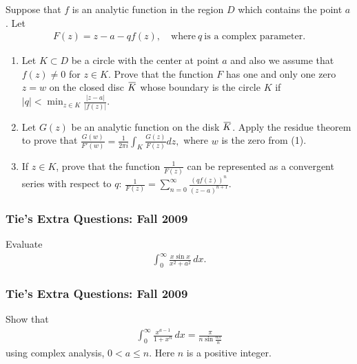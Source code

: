 Suppose that \(f\) is an analytic function in the region \(D\) which
contains the point \(a\). Let
\begin{align*}F(z)= z-a-qf(z),\quad \text{where}~ q \ \text{is a complex parameter}.\end{align*}

\begin{enumerate}
\def\labelenumi{(\arabic{enumi})}
\item
  Let \(K\subset D\) be a circle with the center at point \(a\) and also
  we assume that \(f(z)\not =0\) for \(z\in K\). Prove that the function
  \(F\) has one and only one zero \(z=w\) on the closed disc
  \(\mkern 1.5mu\overline{\mkern-1.5muK\mkern-1.5mu}\mkern 1.5mu\) whose
  boundary is the circle \(K\) if
  \(\displaystyle{ |q|<\min_{z\in K} \frac{|z-a|}{|f(z)|}.}\)\\
\item
  Let \(G(z)\) be an analytic function on the disk
  \(\mkern 1.5mu\overline{\mkern-1.5muK\mkern-1.5mu}\mkern 1.5mu\).
  Apply the residue theorem to prove that
  \(\displaystyle{ \frac{G(w)}{F'(w)}=\frac{1}{2\pi i}\int_K \frac{G(z)}{F(z)} dz,}\)
  where \(w\) is the zero from (1).\\
\item
  If \(z\in K\), prove that the function
  \(\displaystyle{\frac{1}{F(z)}}\) can be represented as a convergent
  series with respect to \(q\):
  \(\displaystyle{ \frac{1}{F(z)}=\sum_{n=0}^{\infty} \frac{(qf(z))^n}{(z-a)^{n+1}}.}\)
\end{enumerate}

\hypertarget{ties-extra-questions-fall-2009-6}{%
\subsubsection{Tie's Extra Questions: Fall
2009}\label{ties-extra-questions-fall-2009-6}}

Evaluate
\begin{align*}\displaystyle{ \int_{0}^{\infty}\frac{x\sin x}{x^2+a^2} \,
dx }.\end{align*}

\hypertarget{ties-extra-questions-fall-2009-7}{%
\subsubsection{Tie's Extra Questions: Fall
2009}\label{ties-extra-questions-fall-2009-7}}

Show that
\begin{align*}
\displaystyle \int_0^\infty \frac{x^{a-1}}{1+x^n} \,dx
= \frac{\pi}{n\sin \frac{a\pi}{n}}
\end{align*}
using complex analysis, \(0 < a \leq n\). Here \(n\) is a positive
integer.

